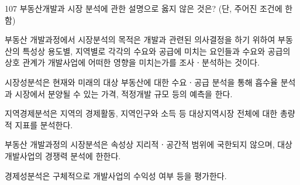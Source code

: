 \begin{question}{107}
부동산개발과 시장 분석에 관한 설명으로 옳지 않은 것은? (단, 주어진 조건에 한함)
\begin{choices}
  \item 부동산 개발과정에서 시장분석의 목적은 개발과 관련된 의사결정을 하기 위하여 부동산의 특성상 용도별, 지역별로 각각의 수요와 공급에 미치는 요인들과 수요와 공급의 상호 관계가 개발사업에 어떠한 영향을 미치는가를 조사ㆍ분석하는 것이다.
  \item 시장성분석은 현재와 미래의 대상 부동산에 대한 수요ㆍ공급 분석을 통해 흡수율 분석과 시장에서 분양될 수 있는 가격, 적정개발 규모 등의 예측을 한다.
  \item 지역경제분석은 지역의 경제활동, 지역인구와 소득 등 대상지역시장 전체에 대한 총량적 지표를 분석한다.
  \item 부동산 개발과정의 시장분석은 속성상 지리적ㆍ공간적 범위에 국한되지 않으며, 대상 개발사업의 경쟁력 분석에 한한다.
  \item 경제성분석은 구체적으로 개발사업의 수익성 여부 등을 평가한다.
\end{choices}
\end{question}

